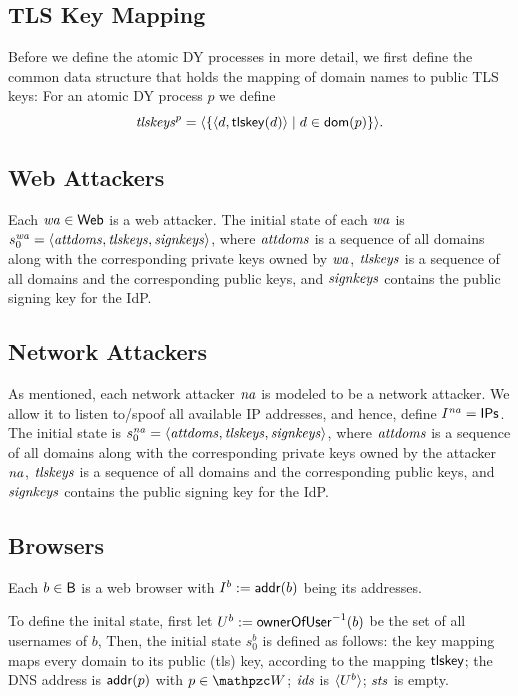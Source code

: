   \subsection{TLS Key Mapping}\label{app:common-data-structures}
  Before we define the atomic DY processes in more detail, we first
  define the common data structure that holds the mapping of domain
  names to public TLS keys: For an atomic DY process $p$ we define
  \[\mathit{tlskeys}^p = \langle\left\{\langle d, \mathsf{tlskey}(d)\rangle \mid d \in \mathsf{dom}(p)\right\}\rangle.\]
  
  \subsection{Web Attackers}\label{app:webattackers-uppresso}
  Each $\mathit{wa} \in \mathsf{Web}$ is a web attacker. 
  The initial state of each $\mathit{wa}$ is 
  $s_0^{\mathit{wa}} = \langle\mathit{attdoms}, \mathit{tlskeys}, \mathit{signkeys}\rangle$, 
  where $\mathit{attdoms}$ is a sequence of all domains along with 
  the corresponding private keys owned by $\mathit{wa}$, 
  $\mathit{tlskeys}$ is a sequence of all domains and 
  the corresponding public keys, and 
  $\mathit{signkeys}$ contains the public signing key for the IdP. 
  
  \subsection{Network Attackers}\label{app:networkattackers-uppresso}
  As mentioned, each network attacker $\mathit{na}$ is modeled to 
  be a network attacker. We allow it to listen to/spoof all 
  available IP addresses, and hence, define 
  $I^{\mathit{na}} = \mathsf{IPs}$. 
  The initial state is $s_0^{\mathit{na}} = 
  \langle\mathit{attdoms}, \mathit{tlskeys}, \mathit{signkeys}\rangle$, 
  where $\mathit{attdoms}$ is a sequence of all domains along with 
  the corresponding private keys owned by the attacker 
  $\mathit{na}$, $\mathit{tlskeys}$ is a sequence of all domains 
  and the corresponding public keys, and 
  $\mathit{signkeys}$ contains the public signing key for the IdP. 
  
  \subsection{Browsers}\label{app:browsers-uppresso} 
  Each $b \in \mathsf{B}$ is a web browser with 
  $I^b := \mathsf{addr}(b)$ being its addresses.
  
  To define the inital state, first let $U^b := 
  \mathsf{ownerOfUser}^{-1}(b)$ be the set of all usernames of $b$, 
  Then, the initial state $s_0^b$ is defined as follows: the key mapping
  maps every domain to its public (tls) key, according to the mapping
  $\mathsf{tlskey}$; the DNS address is $\mathsf{addr}(p)$ with $p \in \bidsystem$;
  $\mathit{ids}$ is $\langle U^b\rangle$; $\mathit{sts}$ is empty.
  

